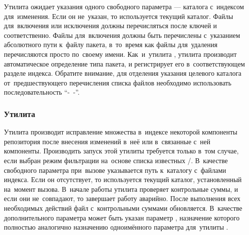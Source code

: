 Утилита  ожидает указания одного свободного параметра --- каталога с~индексом для~изменения.
Если он не~указан, то используется текущий каталог.
Файлы для~включения или исключения должны перечисляться после ключей  и  соответственно.
Файлы для~включения должны быть  перечислены с~указанием абсолютного пути к~файлу пакета, 
в~то~время как файлы для~удаления перечисляются просто по~своему имени.
Как~и~утилита , утилита  производит автоматическое определение типа пакета,
и регистрирует его в~соответствующем разделе индекса.
Обратите внимание, для отделения указания целевого каталога от~предшествующего перечисления  списка файлов необходимо использовать последовательность ``-~-''.

\subsubsection{Утилита }

Утилита  производит исправление множества \provides в~индексе некоторой компоненты репозитория после внесения изменений в~неё 
или в~связанные с~ней компоненты.
Производить запуск этой утилиты требуется только в~том случае, если выбран режим фильтрации \provides на~основе списка известных \requires/\conflicts.
В~качестве свободного параметра при~вызове указывается  путь к~каталогу с~файлами индекса.
Если он отсутствует, то используется текущий каталог, установленный на~момент вызова.
В~начале работы утилита  проверяет   контрольные суммы, и если они не~совпадают, то завершает работу аварийно.
После выполнения всех необходимых действий файл с~контрольными суммами обновляется.
В~качестве дополнительного параметра может быть указан параметр , 
назначение которого полностью аналогично назначению одноимённого параметра для~утилиты .
